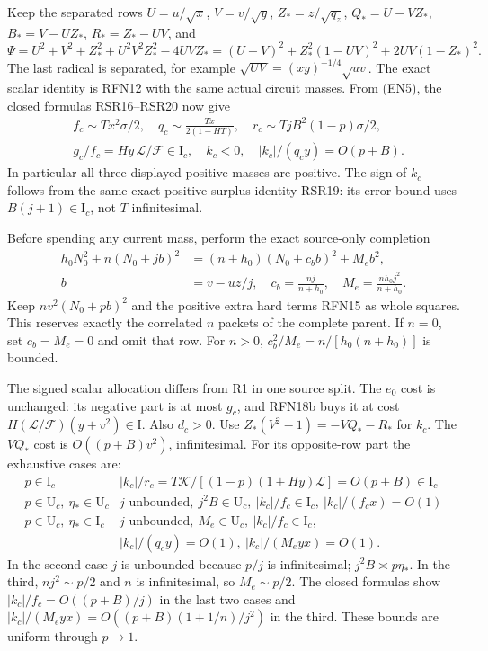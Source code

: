 Keep the separated rows
$U=u/\sqrt{x}$, $V=v/\sqrt{y}$, $Z_*=z/\sqrt{q_z}$,
$Q_*=U-VZ_*$, $B_*=V-UZ_*$, $R_*=Z_*-UV$, and
\[
\Psi=U^2+V^2+Z_*^2+U^2V^2Z_*^2-4UVZ_*
=(U-V)^2+Z_*^2(1-UV)^2+2UV(1-Z_*)^2.                 \tag{EN12}
\]
The last radical is separated, for example
$\sqrt{UV}=(xy)^{-1/4}\sqrt{uv}$.
The exact scalar identity is RFN12 with the same actual circuit
masses. From (EN5), the closed formulas RSR16--RSR20 now give
\[
\begin{aligned}
&f_c\sim Tx^2\sigma/2,\quad
q_c\sim\frac{Tx}{2(1-HT)},\quad
r_c\sim TjB^2(1-p)\sigma/2,\\
&g_c/f_c=Hy\,\mathcal L/\mathcal F\in\mathrm I_c,\quad
k_c<0,\quad |k_c|/(q_cy)=O(p+B).
\end{aligned}                                                    \tag{EN13}
\]
In particular all three displayed positive masses are positive.
The sign of $k_c$ follows from the same exact positive-surplus
identity RSR19: its error bound uses $B(j+1)\in\mathrm I_c$,
not $T$ infinitesimal.

Before spending any current mass, perform the exact source-only
completion
\[
\begin{aligned}
h_0N_0^2+n(N_0+jb)^2
&=(n+h_0)(N_0+c_bb)^2+M_eb^2,\\
b&=v-uz/j,\quad c_b=\frac{nj}{n+h_0},\quad
M_e=\frac{nh_0j^2}{n+h_0}.
\end{aligned}                                                    \tag{EN14}
\]
Keep $nv^2(N_0+pb)^2$ and the positive extra hard terms RFN15
as whole squares. This reserves exactly the correlated $n$ packets
of the complete parent. If $n=0$, set $c_b=M_e=0$ and omit that
row. For $n>0$, $c_b^2/M_e=n/[h_0(n+h_0)]$ is bounded.

The signed scalar allocation differs from R1 in one source split.
The $e_0$ cost is unchanged: its negative part is at most $g_c$,
and RFN18b buys it at cost
$H(\mathcal L/\mathcal F)(y+v^2)\in\mathrm I$.
Also $d_c>0$. Use $Z_*(V^2-1)=-VQ_*-R_*$ for $k_c$.
The $VQ_*$ cost is $O((p+B)v^2)$, infinitesimal.
For its opposite-row part the exhaustive cases are:
\[
\begin{array}{c|l}
p\in\mathrm I_c&
 |k_c|/r_c=
 T\mathcal K/[(1-p)(1+Hy)\mathcal L]=O(p+B)\in\mathrm I_c\\
p\in\mathrm U_c,\ \eta_*\in\mathrm U_c&
 j\text{ unbounded},\ j^2B\in\mathrm U_c,\ 
 |k_c|/f_c\in\mathrm I_c,\ |k_c|/(f_cx)=O(1)\\
p\in\mathrm U_c,\ \eta_*\in\mathrm I_c&
 j\text{ unbounded},\ M_e\in\mathrm U_c,\ 
 |k_c|/f_c\in\mathrm I_c,\\
& |k_c|/(q_cy)=O(1),\ |k_c|/(M_eyx)=O(1).
\end{array}                                                    \tag{EN15}
\]
In the second case $j$ is unbounded because $p/j$ is infinitesimal;
$j^2B\asymp p\eta_*$. In the third,
$nj^2\sim p/2$ and $n$ is infinitesimal, so $M_e\sim p/2$.
The closed formulas show
$|k_c|/f_c=O((p+B)/j)$ in the last two cases and
$|k_c|/(M_eyx)=O((p+B)(1+1/n)/j^2)$ in the third.
These bounds are uniform through $p\to1$.

